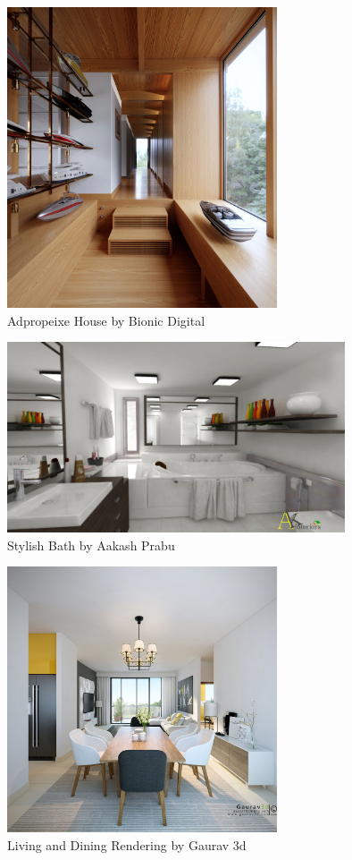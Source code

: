 \begin{figure}
	\centering
		\includegraphics[width=8cm]{img/AH.jpg}
	\caption{Adpropeixe House by Bionic Digital}
	\label{fig:2}
\end{figure}


\begin{figure}
	\centering
		\includegraphics[width=10cm]{img/bath1.jpg}
	\caption{Stylish Bath by Aakash Prabu}
	\label{fig:3}
\end{figure}


\begin{figure}
	\centering
		\includegraphics[width=8cm]{img/8_large.jpg}
	\caption{Living and Dining Rendering by Gaurav 3d}
	\label{fig:4}
\end{figure}



